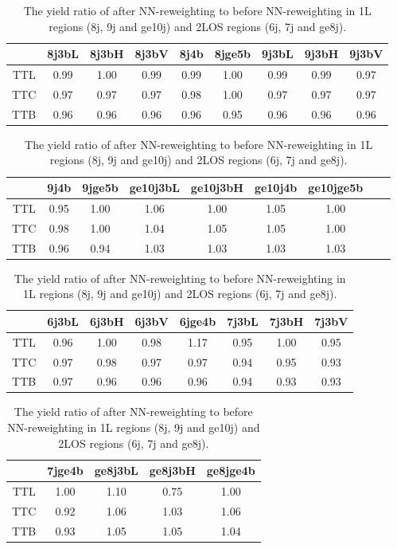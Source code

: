 \begin{table}
\begin{center}
\begin{tabular}{|c|c|c|c|c|c|c|c|c|}
\hline \hline
& 8j3bL & 8j3bH & 8j3bV & 8j4b & 8jge5b & 9j3bL & 9j3bH & 9j3bV \\
\hline
TTL & 0.99 & 1.00 & 0.99 & 0.99 & 1.00 & 0.99 & 0.99 & 0.97 \\
TTC & 0.97 & 0.97 & 0.97 & 0.98 & 1.00 & 0.97 & 0.97 & 0.97 \\
TTB & 0.96 & 0.96 & 0.96 & 0.96 & 0.95 & 0.96 & 0.96 & 0.96 \\
\hline \hline
\end{tabular}

\begin{tabular}{|c|c|c|c|c|c|c|c|c|}
\hline \hline
& 9j4b & 9jge5b & ge10j3bL & ge10j3bH & ge10j4b & ge10jge5b \\
\hline
TTL & 0.95 & 1.00 & 1.06 & 1.00 & 1.05 & 1.00 \\
TTC & 0.98 & 1.00 & 1.04 & 1.05 & 1.05 & 1.00 \\
TTB & 0.96 & 0.94 & 1.03 & 1.03 & 1.03 & 1.03 \\
\hline \hline
\end{tabular}

\begin{tabular}{|c|c|c|c|c|c|c|c|}
\hline \hline
& 6j3bL & 6j3bH & 6j3bV & 6jge4b & 7j3bL & 7j3bH & 7j3bV \\
\hline
TTL & 0.96 & 1.00 & 0.98 & 1.17 & 0.95 & 1.00 & 0.95 \\
TTC & 0.97 & 0.98 & 0.97 & 0.97 & 0.94 & 0.95 & 0.93 \\
TTB & 0.97 & 0.96 & 0.96 & 0.96 & 0.94 & 0.93 & 0.93 \\
\hline \hline
\end{tabular}

\begin{tabular}{|c|c|c|c|c|}
\hline \hline
& 7jge4b & ge8j3bL & ge8j3bH & ge8jge4b \\
\hline
TTL & 1.00 & 1.10 & 0.75 & 1.00 \\
TTC & 0.92 & 1.06 & 1.03 & 1.06 \\
TTB & 0.93 & 1.05 & 1.05 & 1.04 \\
\hline \hline
\end{tabular}

\caption{The yield ratio of after NN-reweighting to before NN-reweighting in 1L regions (8j, 9j and ge10j) and 2LOS regions (6j, 7j and ge8j).}
\label{tab:Rew_NoRew_YieldsRatio}
\end{center}
\end{table}
\clearpage

